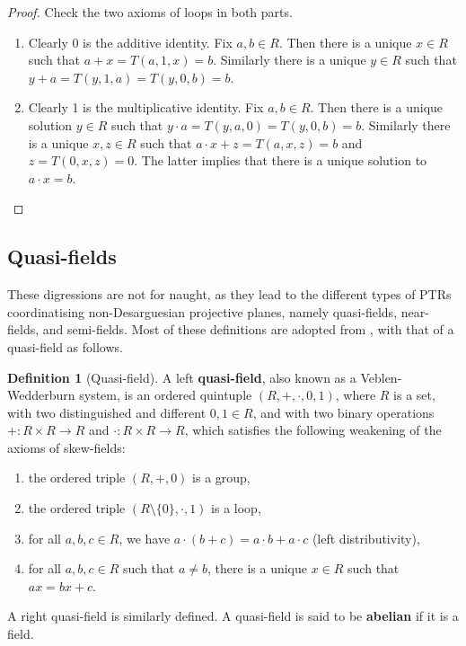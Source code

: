\documentclass{report}
\theoremstyle{definition}\newtheorem*{definition}{Definition}
\theoremstyle{definition}\newtheorem*{example}{Example}
\theoremstyle{remark}\newtheorem*{remark}{Remark}
\begin{document}
\begin{proof}
Check the two axioms of loops in both parts.
\begin{enumerate}
  \item Clearly 0 is the additive identity. Fix $ a, b \in R $. Then there is a unique $ x \in R $ such that $ a + x = T(a, 1, x) = b $. Similarly there is a unique $ y \in R $ such that $ y + a = T(y, 1, a) = T(y, 0, b) = b $.
  \item Clearly 1 is the multiplicative identity. Fix $ a, b \in R $. Then there is a unique solution $ y \in R $ such that $ y \cdot a = T(y, a, 0) = T(y, 0, b) = b $. Similarly there is a unique $ x, z \in R $ such that $ a \cdot x + z = T(a, x, z) = b $ and $ z = T(0, x, z) = 0 $. The latter implies that there is a unique solution to $ a \cdot x = b $.
\end{enumerate}
\end{proof}

\subsection{Quasi-fields}

These digressions are not for naught, as they lead to the different types of PTRs coordinatising non-Desarguesian projective planes, namely quasi-fields, near-fields, and semi-fields. Most of these definitions are adopted from \cite{planarternaryring}, with that of a quasi-field as follows.

\begin{definition}[Quasi-field]
A left \textbf{quasi-field}, also known as a Veblen-Wedderburn system, is an ordered quintuple $ (R, +, \cdot, 0, 1) $, where $ R $ is a set, with two distinguished and different $ 0, 1 \in R $, and with two binary operations $ + : R \times R \to R $ and $ \cdot : R \times R \to R $, which satisfies the following weakening of the axioms of skew-fields:
\begin{enumerate}
  \item the ordered triple $ (R, +, 0) $ is a group,
  \item the ordered triple $ (R \setminus \{ 0 \}, \cdot, 1) $ is a loop,
  \item for all $ a, b, c \in R $, we have $ a \cdot (b + c) = a \cdot b + a \cdot c $ (left distributivity),
  \item for all $ a, b, c \in R $ such that $ a \ne b $, there is a unique $ x \in R $ such that $ a x = b x + c $.
\end{enumerate}
A right quasi-field is similarly defined. A quasi-field is said to be \textbf{abelian} if it is a field.
\end{definition}
\end{document}
